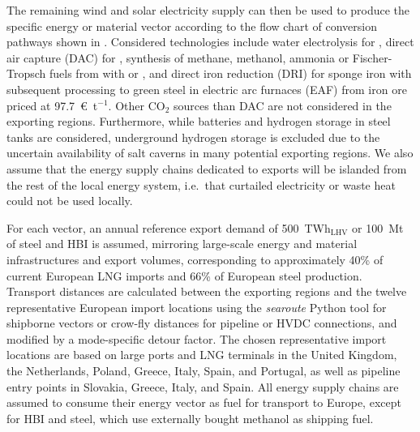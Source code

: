 
The remaining wind and solar electricity supply can then be used to produce the
specific energy or material vector according to the flow chart of conversion
pathways shown in . Considered technologies
include water electrolysis for , direct air capture (DAC) for ,
synthesis of methane, methanol, ammonia or Fischer-Tropsch fuels from 
with  or , and  direct iron reduction (DRI) for sponge
iron with subsequent processing to green steel in electric arc furnaces (EAF)
from iron ore priced at
97.7~\euro{}~t$^{-1}$.\cite{missionpossiblepartnershipSteelSectorTransition2022}
Other CO$_2$ sources than DAC are not considered in the exporting regions.
Furthermore, while batteries and hydrogen storage in steel tanks are considered,
underground hydrogen storage is excluded due to the uncertain availability of
salt caverns in many potential exporting
regions.\cite{hevinUndergroundStorageHydrogen2019,hydrogentcp-task42UndergroundHydrogenStorage2023}
We also assume that the energy supply chains dedicated to exports will be
islanded from the rest of the local energy system, i.e.~that curtailed
electricity or waste heat could not be used locally.

For each vector, an annual reference export demand of 500~TWh$_\text{LHV}$ or
100~Mt of steel and HBI is assumed, mirroring large-scale energy and material
infrastructures and export volumes, corresponding to approximately 40\% of
current European LNG
imports\cite{instituteforenergyeconomicsandfinancialanalysisEuropeanLNG2023} and
66\% of European steel
production.\cite{eurofer-theeuropeansteelassociationEuropeanSteel2023} Transport
distances are calculated between the exporting regions and the twelve
representative European import locations using the \textit{searoute} Python
tool\cite{haliliSeaRoutePython2024} for shipborne vectors or crow-fly distances
for pipeline or HVDC connections, and modified by a mode-specific detour factor.
The chosen representative import locations are based on large ports and LNG
terminals in the United Kingdom, the Netherlands, Poland, Greece, Italy, Spain,
and Portugal, as well as pipeline entry points in Slovakia, Greece, Italy, and
Spain. All energy supply chains are assumed to consume their energy vector as
fuel for transport to Europe, except for HBI and steel, which use externally
bought methanol as shipping fuel.


